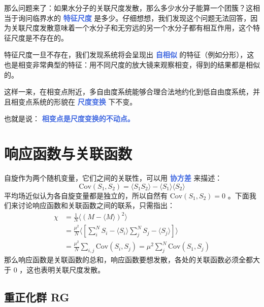 那么问题来了：如果水分子的关联尺度发散，那么多少水分子能算一个团簇？这相当于询问临界水的 \textcolor{RoyalBlue}{\textbf{\kaishu 特征尺度}} 是多少。仔细想想，我们发现这个问题无法回答，因为关联尺度发散意味着一个水分子和无穷远的另一个水分子都有相互作用，这个特征尺度是不存在的。

特征尺度一旦不存在，我们发现系统将会呈现出 \textcolor{RoyalBlue}{\textbf{\kaishu 自相似}} 的特征（例如分形），这也是相变非常典型的特征：用不同尺度的放大镜来观察相变，得到的结果都是相似的。

这样一来，在相变点附近，多自由度系统能够合理合法地约化到低自由度系统，并且相变点系统的形貌在 \textcolor{RoyalBlue}{\textbf{\kaishu 尺度变换}} 下不变。

也就是说： \textcolor{RoyalBlue}{\textbf{\kaishu 相变点是尺度变换的不动点。}}

\section{响应函数与关联函数}\label{sec:响应函数与关联函数}

自旋作为两个随机变量，它们之间的关联性，可以用 \textcolor{RoyalBlue}{\textbf{\kaishu 协方差}} 来描述：
\begin{equation}
    \text{Cov}(S_1,S_2) = \langle S_1 S_2 \rangle - \langle S_1 \rangle \langle S_2 \rangle
\end{equation}
平均场近似认为各自旋变量都是独立的，所以自然有 $\text{Cov}(S_1,S_2) = 0$ 。下面我们来讨论响应函数和关联函数之间的联系，只需指出：
\begin{equation}
    \begin{aligned}
        \chi &= \frac{1}{N} \langle (M-\langle M \rangle)^2 \rangle \\
        &= \frac{\mu^2}{N}\langle \left[\sum_i^N S_i - \langle S_i \rangle\sum_j^N S_j - \langle S_j \rangle\right] \rangle \\
        &= \frac{\mu^2}{N} \sum_{i,j}\text{Cov}(S_i,S_j) = \mu^2 \sum_{j}^N\text{Cov}(S_1,S_j)
    \end{aligned}
\end{equation}
那么响应函数是关联函数的总和，响应函数要想发散，各处的关联函数必须全都大于 $0$ ，这也表明关联尺度发散。

\subsection{重正化群 RG}